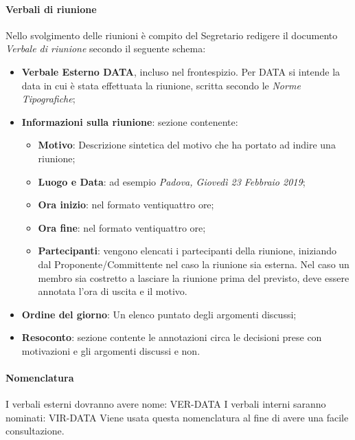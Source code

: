                     \paragraph{Verbali di riunione}
                       Nello svolgimento delle riunioni è compito del Segretario redigere il documento \textit{Verbale di riunione} secondo il seguente schema:
                        \begin{itemize}
                            \item \textbf{Verbale Esterno DATA}, incluso nel frontespizio. Per DATA si intende la data in cui è stata effettuata la riunione, scritta secondo le \textit{Norme Tipografiche};
                            \item \textbf{Informazioni sulla riunione}: sezione contenente:
                            \begin{itemize}
                                \item \textbf{Motivo}: Descrizione sintetica del motivo che ha portato ad indire una riunione;
                                \item \textbf{Luogo e Data}: ad esempio \textit{Padova, Giovedì 23 Febbraio 2019}; 
                                \item \textbf{Ora inizio}: nel formato ventiquattro ore;
                                \item \textbf{Ora fine}: nel formato ventiquattro ore;
                                \item \textbf{Partecipanti}: vengono elencati i partecipanti della riunione, iniziando dal Proponente/Committente nel caso la riunione sia esterna. Nel caso un membro sia costretto a lasciare la riunione prima del previsto, deve essere annotata l'ora di uscita e il motivo.
                            \end{itemize}
                            \item \textbf{Ordine del giorno}: Un elenco puntato degli argomenti discussi; 
                            \item \textbf{Resoconto}: sezione contente le annotazioni circa le decisioni prese con motivazioni e gli argomenti discussi e non.
                        \end{itemize}
                        \paragraph{Nomenclatura} 
                            I verbali esterni dovranno avere nome:
                            VER-DATA
                            \newline
                            I verbali interni saranno nominati:
                            VIR-DATA
                            \newline
                            Viene usata questa nomenclatura al fine di avere una facile consultazione.
                            \newline
